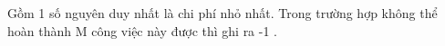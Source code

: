 Gồm 1 số nguyên duy nhất là chi phí nhỏ nhất. Trong trường hợp không thể hoàn thành M công việc này được thì ghi ra -1 .  

\